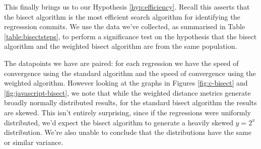 \documentclass[10pt,journal,compsoc]{IEEEtran}
\begin{document}
\begin{figure*}[t]
\centering
{}
\hfil
{}
\hfil
{}
\hfil
{}
\caption{\label{fig:c-bisect}Histograms for the C language of the number of steps required to complete the bisect algorithm using (a) the standard metric; (b) the weighted commit metric; (c) the weighted lines changed metric; (d) the weighted hunks changed metric. The dashed line indicates the mean, the dotted lines a one-standard-deviation interval on each side it.}
\end{figure*}

\begin{figure*}[t]
\centering
{}
\hfil
{}
\hfil
{}
\hfil
{}
\caption{\label{fig:javascript-bisect}Histograms for the JavaScript language of the number of steps required to complete the bisect algorithm using (a) the standard metric; (b) the weighted commit metric; (c) the weighted lines changed metric; (d) the weighted hunks changed metric. The dashed line indicates the mean, the dotted lines a one-standard-deviation interval on each side it.}
\end{figure*}

This finally brings us to our Hypothesis \ref{hyp:efficiency}. Recall this asserts that the bisect algorithm is the most efficient search algorithm for identifying the regresssion commits. We use the data we've collected, as summarised in Table \ref{table:bisectsteps}, to perform a significance test on the hypothesis that the bisect algorithm and the weighted bisect algorithm are from the same population.

The datapoints we have are paired: for each regression we have the speed of convergence using the standard algorithm and the speed of convergence using the weighted algorithm. However looking at the graphs in Figures \ref{fig:c-bisect} and \ref{fig:javascript-bisect}, we note that while the weighted distance metrics generate broadly normally distributed results, for the standard bisect algorithm the results are skewed. This isn't entirely surprising, since if the regressions were uniformly distributed, we'd expect the bisect algorithm to generate a heavily skewed $y = 2^x$ distribution. We're also unable to conclude that the distributions have the same or similar variance.
\end{document}
